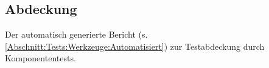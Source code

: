 %



\subsection{Abdeckung}
\label{Abschnitt:Tests:Statistik:Abdeckung}


Der automatisch generierte Bericht (s. \ref{Abschnitt:Tests:Werkzeuge:Automatisiert}) zur Testabdeckung durch Komponententests.





